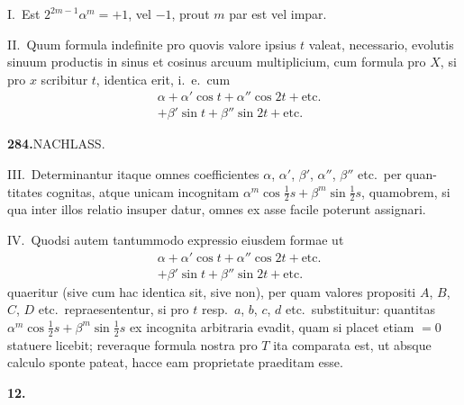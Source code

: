 \documentclass[12pt,a4paper]{article}
\begin{document}
\smallskip\noindent
I.\ Est $2^{2m-1}\alpha^m = +1$, vel $-1$, prout $m$ par est vel impar.

\smallskip\noindent
II.\ Quum formula indefinite pro quovis valore ipsius $t$ valeat, necessario,
evolutis sinuum productis in sinus et cosinus arcuum multiplicium, cum formula
pro $X$, si pro $x$ scribitur $t$, identica erit, i.~e.\ cum
\begin{align*}
&\alpha + \alpha'\cos t + \alpha''\cos 2t + \text{etc.}\\
&+ \beta'\sin t + \beta''\sin 2t + \text{etc.}
\end{align*}

\newpage
\noindent\textbf{284.}\quad NACHLASS.

\smallskip\noindent
III.\ Determinantur itaque omnes coefficientes $\alpha$, $\alpha'$, $\beta'$, $\alpha''$, $\beta''$ etc.\ per quan-
titates cognitas, atque unicam incognitam $\alpha^m\cos\tfrac{1}{2}s+\beta^m\sin\tfrac{1}{2}s$, quamobrem, si
qua inter illos relatio insuper datur, omnes ex asse facile poterunt assignari.

\smallskip\noindent
IV.\ Quodsi autem tantummodo expressio eiusdem formae ut
\begin{align*}
&\alpha + \alpha'\cos t + \alpha''\cos 2t + \text{etc.}\\
&+ \beta'\sin t + \beta''\sin 2t + \text{etc.}
\end{align*}
quaeritur (sive cum hac identica sit, sive non), per quam valores propositi
$A$, $B$, $C$, $D$ etc.\ repraesententur, si pro $t$ resp.\ $a$, $b$, $c$, $d$ etc.\ substituitur: quantitas
$\alpha^m\cos\tfrac{1}{2}s+\beta^m\sin\tfrac{1}{2}s$ ex incognita arbitraria evadit, quam si placet etiam $=0$
statuere licebit; reveraque formula nostra pro $T$ ita comparata est, ut absque
calculo sponte pateat, hacce eam proprietate praeditam esse.

\smallskip\noindent
\textbf{12.}
\end{document}
